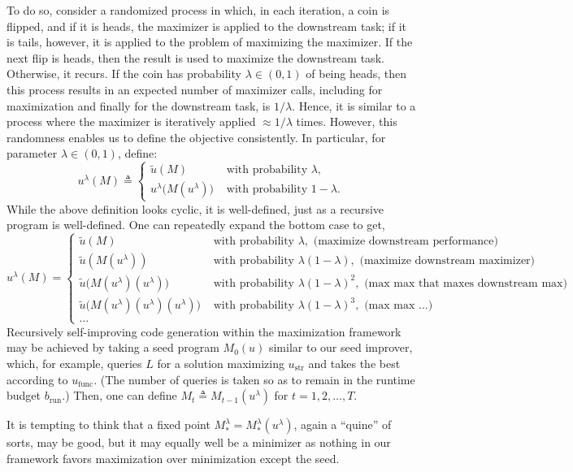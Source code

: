 \documentclass{article}
\newcommand{\maxutil}{{\tilde{u}}}
\newcommand{\defeq}{\triangleq}
\begin{document}
To do so, consider a randomized process in which, in each iteration, a coin is flipped, and if it is heads, the maximizer is applied to the downstream task; if it is tails, however, it is applied to the problem of maximizing the maximizer. If the next flip is heads, then the result is used to maximize the downstream task. Otherwise, it recurs. If the coin has probability $\lambda \in (0,1)$ of being heads, then this process results in an expected number of maximizer calls, including for maximization and finally for the downstream task, is $1/\lambda$. Hence, it is similar to a process where the maximizer is iteratively applied $\approx 1/\lambda$ times.
However, this randomness enables us to define the objective consistently. In particular, for parameter $\lambda \in (0,1)$, define:
\[u^\lambda(M) \defeq 
\begin{cases}
\maxutil(M)
 & \text{ with probability } \lambda,\\
u^\lambda\bigl(M(u^\lambda)\bigr) & \text{ with probability } 1-\lambda.
\end{cases}
\]
While the above definition looks cyclic, it is well-defined, just as a recursive program is well-defined.
One can repeatedly expand the bottom case to get,
\[u^\lambda(M) =
\begin{cases}
\maxutil(M) & \text{ with probability } \lambda, \text{ (maximize downstream performance)}\\
\maxutil(M(u^\lambda)) & \text{ with probability } \lambda(1-\lambda), \text{ (maximize downstream maximizer)} \\
\maxutil\bigl(M(u^\lambda)(u^\lambda)\bigr) & \text{ with probability } \lambda(1-\lambda)^2, \text{ (max max that maxes downstream max)}\\
\maxutil\bigl(M(u^\lambda)(u^\lambda)(u^\lambda)\bigr) & \text{ with probability } \lambda(1-\lambda)^3, \text{ (max max ...)}\\
... & 
\end{cases}
\]
Recursively self-improving code generation within the maximization framework may be achieved by taking a seed program $M_0(u)$ similar to our seed improver, which, for example, queries $L$ for a solution maximizing $u_\text{str}$ and takes the best according to $u_\text{func}$. (The number of queries is taken so as to remain in the runtime budget $b_\text{run}$.) Then, one can define $M_t \defeq M_{t-1}(u^\lambda)$ for $t=1,2,\ldots,T.$

It is tempting to think that a fixed point $M_*^\lambda=M_*^\lambda(u^\lambda)$, again a ``quine'' of sorts, may be good, but it may equally well be a minimizer as nothing in our framework favors maximization over minimization except the seed.  
\end{document}
